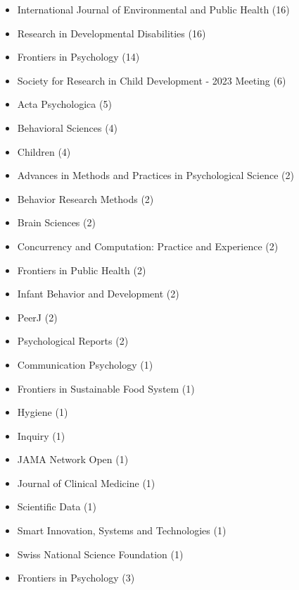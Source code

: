 \documentclass[10pt,a4paper]{altacv}
\begin{document}
\begin{fullwidth}
\begin{itemize}
			\item International Journal of Environmental and Public Health (16)
			\item Research in Developmental Disabilities (16)
			\item Frontiers in Psychology (14)
			\item Society for Research in Child Development - 2023 Meeting (6)
			\item Acta Psychologica (5)
			\item Behavioral Sciences (4)
			\item Children (4)
			\item Advances in Methods and Practices in Psychological Science (2)
			\item Behavior Research Methods (2)
			\item Brain Sciences (2)
			\item Concurrency and Computation: Practice and Experience (2)
			\item Frontiers in Public Health (2)
			\item Infant Behavior and Development (2)
			\item PeerJ (2)
			\item Psychological Reports (2)
            \item Communication Psychology (1)
			\item Frontiers in Sustainable Food System (1)
			\item Hygiene (1)
			\item Inquiry (1)
			\item JAMA Network Open (1)
			\item Journal of Clinical Medicine (1)
			\item Scientific Data (1)
			\item Smart Innovation, Systems and Technologies (1)
			\item Swiss National Science Foundation (1)
		\end{itemize}
		
		\begin{itemize}
			\item Frontiers in Psychology (3)
		\end{itemize}
	
		

\end{fullwidth}
\end{document}
